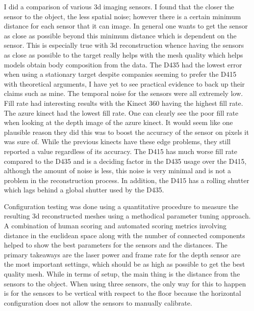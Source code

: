 I did a comparison of various 3d imaging sensors. I found that the closer the sensor to the object, the less spatial noise; however there is a certain minimum distance for each sensor that it can image. In general one wants to get the sensor as close as possible beyond this minimum distance which is dependent on the sensor. This is especially true with 3d reconstruction whence having the sensors as close as possible to the target really helps with the mesh quality which helps models obtain body composition from the data. The D435 had the lowest error when using a stationary target despite companies seeming to prefer the D415 with theoretical arguments, I have yet to see practical evidence to back up their claims such as mine. The temporal noise for the sensors were all extremely low. Fill rate had interesting results with the Kinect 360 having the highest fill rate. The azure kinect had the lowest fill rate. One can clearly see the poor fill rate when looking at the depth image of the azure kinect. It would seem like one plausible reason they did this was to boost the accuracy of the sensor on pixels it was sure of. While the previous kinects have these edge problems, they still reported a value regardless of its accuracy. The D415 has much worse fill rate compared to the D435 and is a deciding factor in the D435 usage over the D415, although the amount of noise is less, this noise is very minimal and is not a problem in the reconstruction process. In addition, the D415 has a rolling shutter which lags behind a global shutter used by the D435.

Configuration testing was done using a quantitative procedure to measure the resulting 3d reconstructed meshes using a methodical parameter tuning approach. A combination of human scoring and automated scoring metrics involving distance in the euclidean space along with the number of connected components helped to show the best parameters for the sensors and the distances. The primary takeaways are the laser power and frame rate for the depth sensor are the most important settings, which should be as high as possible to get the best quality mesh. While in terms of setup, the main thing is the distance from the sensors to the object. When using three sensors, the only way for this to happen is for the sensors to be vertical with respect to the floor because the horizontal configuration does not allow the sensors to manually calibrate. 

